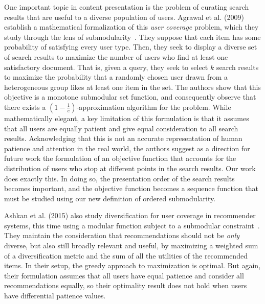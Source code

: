 One important topic in content presentation is the problem of curating search results that are useful to a diverse population of users. Agrawal et al. (2009) establish a mathematical formalization of this \emph{user coverage} problem, which they study through the lens of submodularity~\cite{agrawal2009}. They suppose that each item has some probability of satisfying every user type. Then, they seek to display a diverse set of search results to maximize the number of users who find at least one satisfactory document. That is, given a query, they seek to select $k$ search results to maximize the probability that a randomly chosen user drawn from a heterogeneous group likes at least one item in the set. The authors show that this objective is a monotone submodular set function, and consequently observe that there exists a $(1-\frac{1}{e})$-approximation algorithm for the problem. While mathematically elegant, a key limitation of this formulation is that it assumes that all users are equally patient and give equal consideration to all search results. Acknowledging that this is not an accurate representation of human patience and attention in the real world, the authors suggest as a direction for future work the formulation of an objective function that accounts for the distribution of users who stop at different points in the search results. Our work does exactly this. In doing so, the presentation order of the search results becomes important, and the objective function becomes a sequence function that must be studied using our new definition of ordered submodularity. 

Ashkan et al. (2015) also study diversification for user coverage in recommender systems, this time using a modular function subject to a submodular constraint~\cite{ashkan2015}. They maintain the consideration that recommendations should not be \emph{only} diverse, but also still broadly relevant and useful, by maximizing a weighted sum of a diversification metric and the sum of all the utilities of the recommended items. In their setup, the greedy approach to maximization is optimal. But again, their formulation assumes that all users have equal patience and consider all recommendations equally, so their optimality result does not hold when users have differential patience values. 


